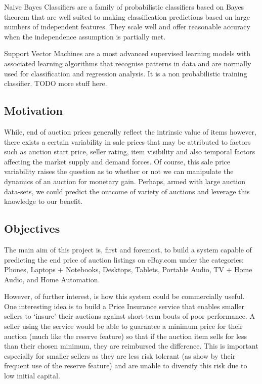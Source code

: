\documentclass[12pt]{article}
\begin{document}
Naive Bayes Classifiers are a family of probabilistic classifiers based on Bayes theorem that are well suited to making classification predictions based on large numbers of independent features. They scale well and offer reasonable accuracy when the independence assumption is partially met.

Support Vector Machines are a most advanced supervised learning models with associated learning algorithms that recognise patterns in data and are normally used for classification and regression analysis. It is a non probabilistic training classifier.
TODO more stuff here.



\subsection{Motivation}
While, end of auction prices generally reflect the intrinsic value of items however, there exists a certain variability in sale prices that may be attributed to factors such as auction start price, seller rating, item visibility and also temporal factors affecting the market supply and demand forces. 
Of course, this sale price variability raises the question as to whether or not we can manipulate the dynamics of an auction for monetary gain. Perhaps, armed with large auction data-sets, we could predict the outcome of variety of auctions and leverage this knowledge to our benefit.

\subsection{Objectives}
The main aim of this project is, first and foremost, to build a system capable of predicting the end price of auction listings on eBay.com under the categories: Phones, Laptops + Notebooks, Desktops, Tablets, Portable Audio, TV + Home Audio, and Home Automation.\newline

However, of further interest, is how this system could be commercially useful. One interesting idea is to build a Price Insurance service that enables smaller sellers to ‘insure’ their auctions against short-term bouts of poor performance. A seller using the service would be able to guarantee a minimum price for their auction (much like the reserve feature) so that if the auction item sells for less than their chosen minimum, they are reimbursed the difference. This is important especially for smaller sellers as they are less risk tolerant (as show by their frequent use of the reserve feature) and are unable to diversify this risk due to low initial capital.
\end{document}
